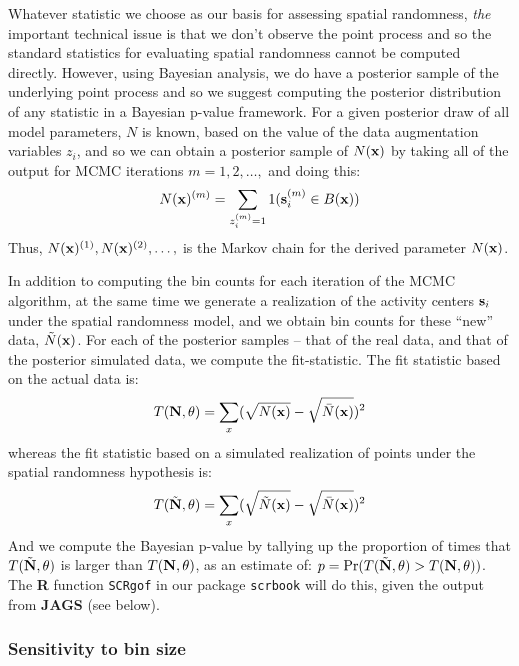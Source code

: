 {Whatever statistic we choose as our basis for assessing spatial
randomness, {\it the} important technical issue is that we don't
observe the point process and so the standard statistics for
evaluating spatial randomness cannot be computed directly.  However,
using Bayesian analysis, we do have a posterior sample of the
underlying point process and so we suggest computing the posterior
distribution of any statistic in a Bayesian p-value framework.
For a given
posterior draw of all model parameters, $N$ is known, based on the
value of the data augmentation variables $z_{i}$, and so we can obtain
a posterior sample of $N({\bf x})$ by taking all of the output for
MCMC iterations $m=1,2,\ldots,$ and doing this:
\[
   N({\bf x})^{(m)} = \sum_{z_{i}^{(m)}=1} 1({\bf s}_{i}^{(m)} \in B({\bf x}))
\]
Thus, $N({\bf x})^{(1)}, N({\bf x})^{(2)}, \ldots,$ is the Markov
chain for the derived parameter $N({\bf x})$.

In addition to computing the bin counts for each iteration of the MCMC
algorithm, at the same time we generate a realization of the activity
centers ${\bf s}_{i}$ under the spatial randomness model, and we
obtain bin counts for these ``new'' data, $\tilde{N}({\bf x})$. For each of
the posterior samples -- that of the real data, and that of the
posterior simulated data, we compute the fit-statistic. The fit 
statistic based on the actual data is:
\[
T({\bf N},\theta) = \sum_{x}  (\sqrt{N({\bf x})} - \sqrt{ \bar{N}({\bf x})})^2
\]
whereas the fit statistic based on a simulated realization of points under the
spatial randomness hypothesis is:
\[
T(\tilde{\bf N},\theta) = \sum_{x}  (\sqrt{\tilde{N}({\bf x})} - \sqrt{
  \bar{N}({\bf x})})^2
\]
And we compute the Bayesian p-value by tallying up the proportion of
times that $T(\tilde{\bf N},\theta)$ is larger than $T({\bf
  N},\theta)$, as an estimate of: $p = \Pr(T(\tilde{\bf N},\theta) >
T({\bf N},\theta))$.  The {\bf R} function {\tt SCRgof} in our package
\mbox{\tt scrbook} will do this, given
the output from {\bf JAGS}
(see below).



\subsubsection{Sensitivity to bin size}

}
